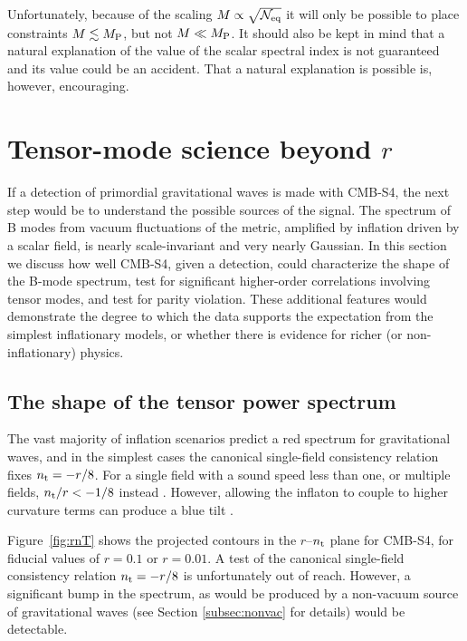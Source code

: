 Unfortunately, because of the scaling $M\propto \sqrt{\mathcal{N}_{\rm eq}}$ it will only be possible to place constraints $M\lesssim M_{\rm P}$, but not $M\ll M_{\rm P}$. It should also be kept in mind that a natural explanation of the value of the scalar spectral index is not guaranteed and its value could be an accident. That a natural explanation is possible is, however, encouraging.

\section{Tensor-mode science beyond $r$}
\label{sec:beyond_r}

If a detection of primordial gravitational waves is made with CMB-S4, the next step would be to understand the possible sources of the signal. The spectrum of B modes from vacuum fluctuations of the metric, amplified by inflation driven by a scalar field, is nearly scale-invariant and very nearly Gaussian. In this section we discuss how well CMB-S4, given a detection, could characterize the shape of the B-mode spectrum, test for significant higher-order correlations involving tensor modes, and test for parity violation. These additional features would demonstrate the degree to which the data supports the expectation from the simplest inflationary models, or whether there is evidence for richer (or non-inflationary) physics. %

\subsection{The shape of the tensor power spectrum}
The vast majority of inflation scenarios predict a red spectrum for gravitational waves, and in the simplest cases the canonical single-field consistency relation fixes $n_{\rm t}=-r/8$. For a single field with a sound speed less than one, or multiple fields, $n_{\rm t}/r<-1/8$ instead \cite{Price:2014ufa}. However, allowing the inflaton to couple to higher curvature terms can produce a blue tilt \cite{Baumann:2015xxa}. 

Figure~\ref{fig:rnT} shows the projected contours in the $r$--$n_{\rm t}$ plane for CMB-S4, for fiducial values of $r=0.1$ or $r=0.01$. A test of the canonical single-field consistency relation $n_{\rm t}=-r/8$ is unfortunately out of reach. However, a significant bump in the spectrum, as would be produced by a non-vacuum source of gravitational waves (see Section \ref{subsec:nonvac} for details) would be detectable. 

